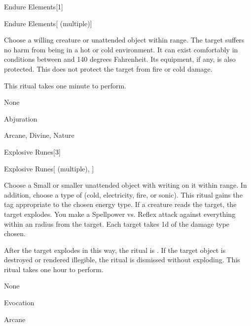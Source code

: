\begin{spellsection}{Endure Elements}[1]


\begin{ability}{Endure Elements}[ (multiple)]

Choose a willing creature or unattended object within \rngclose range.
The target suffers no harm from being in a hot or cold environment.
It can exist comfortably in conditions between  and 140 degrees Fahrenheit.
Its equipment, if any, is also protected.
This does not protect the target from fire or cold damage.

This ritual takes one minute to perform.

\end{ability}


 None

 Abjuration

 Arcane, Divine, Nature
\end{spellsection}


\begin{spellsection}{Explosive Runes}[3]


\begin{ability}{Explosive Runes}[ (multiple), ]

Choose a Small or smaller unattended object with writing on it within \rngclose range.
In addition, choose a type of  (cold, electricity, fire, or sonic).
This ritual gains the tag appropriate to the chosen energy type.
If a creature reads the target, the target explodes.
You make a Spellpower vs. Reflex attack against everything within an \areamed radius from the target.
\hit Each target takes  \minus1d of the damage type chosen.

After the target explodes in this way, the ritual is .
If the target object is destroyed or rendered illegible, the ritual is dismissed without exploding.
This ritual takes one hour to perform.

\end{ability}


 None

 Evocation

 Arcane
\end{spellsection}


